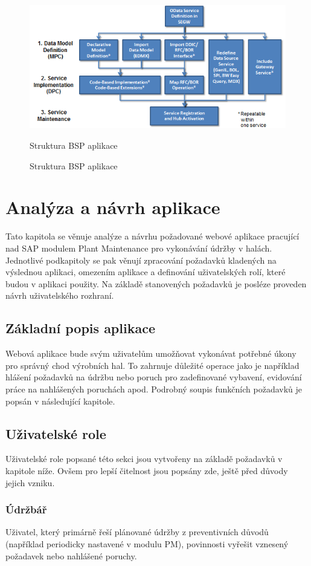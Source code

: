 \documentclass[thesis=M,czech]{FITthesis}[2012/06/26]
\begin{document}
\begin{figure}[H]
	\centering
	\includegraphics[width=1\textwidth]{images/odata.png}
	\caption{Struktura BSP aplikace}
	\label{img:bsp}
	\small
	Struktura BSP aplikace
\end{figure}

\chapter{Analýza a návrh aplikace}
Tato kapitola se věnuje analýze a návrhu požadované webové aplikace pracující nad SAP modulem Plant Maintenance pro vykonávání údržby v halách. Jednotlivé podkapitoly se pak věnují zpracování požadavků kladených na výslednou aplikaci, omezením aplikace a definování uživatelských rolí, které budou v aplikaci použity. Na základě stanovených požadavků je posléze proveden návrh uživatelského rozhraní.  


\section{Základní popis aplikace}
Webová aplikace bude svým uživatelům umožňovat vykonávat potřebné úkony pro správný chod výrobních hal. To zahrnuje důležité operace jako je například hlášení požadavků na údržbu nebo poruch pro zadefinované vybavení, evidování práce na nahlášených poruchách apod. Podrobný soupis funkčních požadavků je popsán v následující kapitole. 


\section{Uživatelské role}
\label{sec:role}
Uživatelské role popsané této sekci jsou vytvořeny na základě požadavků v kapitole níže. Ovšem pro lepší čitelnost jsou popsány zde, ještě před důvody jejich vzniku. 
\subsection{Údržbář}
\label{ssec:udrzbar}
Uživatel, který primárně řeší plánované údržby z preventivních důvodů (například periodicky nastavené v modulu PM), povinnosti vyřešit vznesený požadavek nebo nahlášené poruchy.
\end{document}
